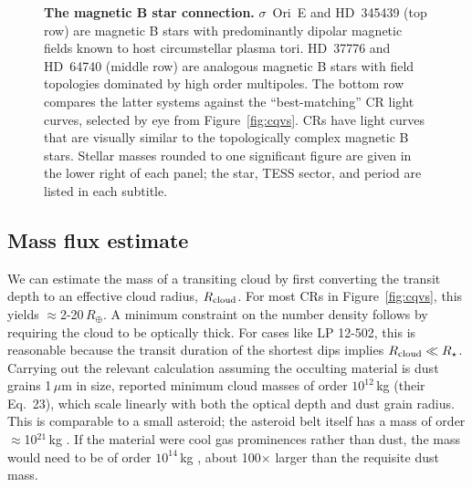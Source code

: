 \documentclass[11pt,twocolumn,tighten]{aastex63}
\begin{document}
\begin{figure}[!th]
	\begin{center}
		\centering
			
		\vspace{-0.35cm}

		\vspace{-0.35cm}

		\vspace{-0.1cm}
		\caption{
      {\bf The magnetic B star connection.}
      $\sigma$~Ori~E and HD~345439 (top row) are magnetic B stars with
      predominantly dipolar magnetic fields known to host
      circumstellar plasma tori.  HD~37776 and HD~64740 (middle row)
      are analogous magnetic B stars with field topologies dominated by
      high order multipoles.  The bottom row compares the latter
      systems against the ``best-matching'' CR light curves, selected
      by eye from Figure~\ref{fig:cqvs}.  CRs have light curves that
      are visually similar to the topologically complex magnetic B
      stars.  Stellar masses rounded to one significant figure are
      given in the lower right of each panel; the star, TESS sector,
      and period are listed in each subtitle.
		}
		\label{fig:bstar}
	\end{center}
\end{figure}


\subsection{Mass flux estimate}
\label{subsec:massflux}

We can estimate the mass of a transiting cloud by first converting the
transit depth to an effective cloud radius, $R_{\rm cloud}$.  For most
CRs in Figure~\ref{fig:cqvs}, this yields $\approx$2-20\,$R_\oplus$.
A minimum constraint on the number density follows by requiring the
cloud to be optically thick.  For cases like LP 12-502, this is
reasonable because the transit duration of the shortest dips implies
$R_{\rm cloud}\ll R_\star$.  Carrying out the relevant calculation
assuming the occulting material is dust grains 1\,$\mu$m in size,
\citet{2023MNRAS.518.4734S} reported minimum cloud masses of order
$10^{12}$\,kg (their Eq.~23), which scale linearly with both the
optical depth and dust grain radius.  This is comparable to a small
asteroid; the asteroid belt itself has a mass of order
$\approx$10$^{21}$\,kg \citep{2019Icar..319..812P}.  If the material
were cool gas prominences rather than dust, the mass would need to be
of order $10^{14}$\,kg \citep{1990MNRAS.247..415C}, about 100$\times$
larger than the requisite dust mass.
\end{document}
